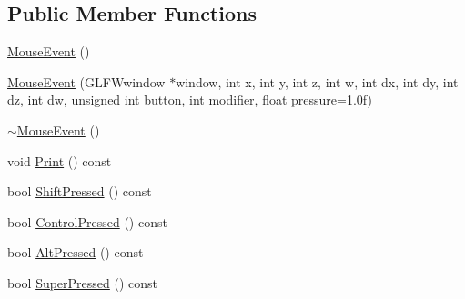 \subsection*{Public Member Functions}
\begin{DoxyCompactItemize}
\item 
\mbox{\hyperlink{structec_1_1_mouse_event_a4a2528518564c73d9b06284c9530b000}{Mouse\+Event}} ()
\item 
\mbox{\hyperlink{structec_1_1_mouse_event_af9aa266623dd0b951176a97969ab11f7}{Mouse\+Event}} (G\+L\+F\+Wwindow $\ast$window, int x, int y, int z, int w, int dx, int dy, int dz, int dw, unsigned int button, int modifier, float pressure=1.\+0f)
\item 
\mbox{\hyperlink{structec_1_1_mouse_event_a1284b01bc0cbece09efe65d2469b7f26}{$\sim$\+Mouse\+Event}} ()
\item 
void \mbox{\hyperlink{structec_1_1_mouse_event_a76584afb7dcfff8723d44611b7ae0012}{Print}} () const
\item 
bool \mbox{\hyperlink{structec_1_1_mouse_event_aa597b597421e4103026f4f8e392308ad}{Shift\+Pressed}} () const
\item 
bool \mbox{\hyperlink{structec_1_1_mouse_event_a5260b0ecf051b865acec9837008c1e15}{Control\+Pressed}} () const
\item 
bool \mbox{\hyperlink{structec_1_1_mouse_event_a8dd57a973960b3a8d83303980ac3175e}{Alt\+Pressed}} () const
\item 
bool \mbox{\hyperlink{structec_1_1_mouse_event_a3123e71a559b93f0617c06bb9a222d4d}{Super\+Pressed}} () const
\end{DoxyCompactItemize}
